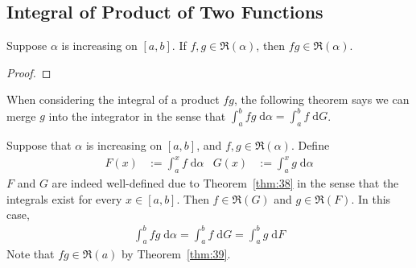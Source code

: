 \documentclass[thmcnt=section, 12pt]{elegantbook}
\begin{document}

\subsection{Integral of Product of Two Functions}


\begin{theorem} \label{thm:39}
    Suppose $\alpha$ is increasing on $[a, b]$. If $f, g \in \mathfrak{R}(\alpha)$, then $fg \in \mathfrak{R}(\alpha)$.
\end{theorem}

\begin{proof}
\end{proof}


\par When considering the integral of a product $fg$, the following theorem says we can merge $g$ into the integrator in the sense that $\int_a^b fg \; \mathrm{d}\alpha = \int_a^b f \; \mathrm{d}G$.

\begin{theorem} \label{thm:41}
    Suppose that $\alpha$ is increasing on $[a, b]$, and  $f, g \in \mathfrak{R}(\alpha)$. Define 
    \begin{align*}
        F(x) &:= \int_a^x f \; \mathrm{d}\alpha &
        G(x) &:= \int_a^x g \; \mathrm{d}\alpha
    \end{align*}
    $F$ and $G$ are indeed well-defined due to Theorem~\ref{thm:38} in the sense that the integrals exist for every $x \in [a, b]$. Then $f \in \mathfrak{R}(G)$ and $g \in \mathfrak{R}(F)$. In this case,
    \begin{align}
        \int_a^b f g \; \mathrm{d}\alpha
        = \int_a^b f \; \mathrm{d}G
        = \int_a^b g \; \mathrm{d}F
        \label{eq:97}
    \end{align}
    Note that $fg \in \mathfrak{R}(a)$ by Theorem~\ref{thm:39}.
\end{theorem}
\end{document}
